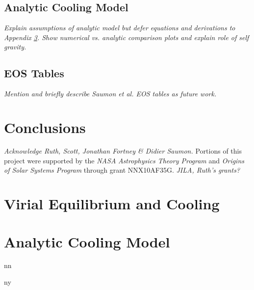 \documentclass[apj]{emulateapj}
\newcommand\submitms{n}		%
\newcommand\bibinc{n}		%
\newcommand{\emgr}[1]{\emph{ \color{gray} #1}}
\begin{document}
\subsection{Analytic Cooling Model}
\emgr{Explain assumptions of analytic model but defer equations and derivations to Appendix \ref{sec:analytic}. Show numerical vs. analytic comparison plots and explain role of self gravity. }
\subsection{EOS Tables}
\emgr{Mention and briefly describe Saumon et al. EOS tables as future work. }

\section{Conclusions}





\acknowledgements
\emgr{Acknowledge Ruth, Scott, Jonathan Fortney \& Didier Saumon.}  Portions of this project were supported by the {\it NASA} {\it Astrophysics Theory Program} and  {\it Origins of Solar Systems Program}  through grant NNX10AF35G. \emgr{JILA, Ruth's grants?}\\

\appendix
\section{Virial Equilibrium and Cooling}\label{sec:virial}
\section{Analytic Cooling Model}\label{sec:analytic}
\if\bibinc n

\fi

\if\bibinc y
\begin{thebibliography}
\end{thebibliography}
\fi
\end{document}
